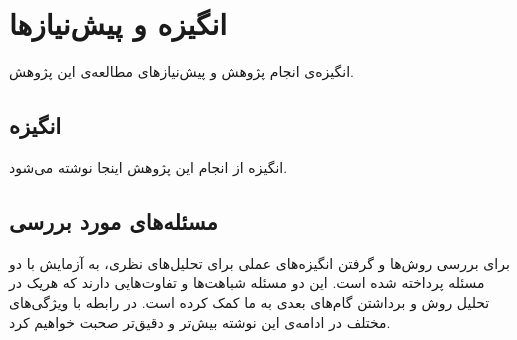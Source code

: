 

\section{
انگیزه و پیش‌نیازها
}

انگیزه‌ی انجام پژوهش و پیش‌نیازهای مطالعه‌ی این پژوهش.













\subsection{
انگیزه
}

انگیزه از انجام این پژوهش اینجا نوشته می‌شود.



\subsection{
مسئله‌های مورد بررسی
}
برای بررسی روش‌ها و گرفتن انگیزه‌های عملی برای تحلیل‌های نظری، به آزمایش با دو مسئله پرداخته شده است. این دو مسئله شباهت‌ها و تفاوت‌هایی دارند که هریک در تحلیل روش و برداشتن گام‌های بعدی به ما کمک کرده است. در رابطه با ویژگی‌های مختلف در ادامه‌ی این نوشته بیش‌تر و دقیق‌تر صحبت خواهیم کرد.

